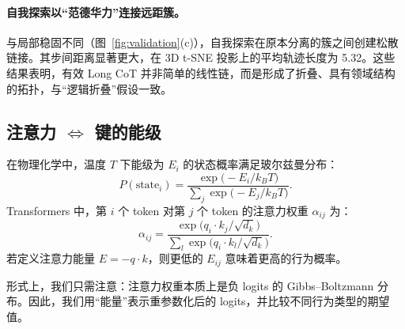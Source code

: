 \paragraph{\textbf{自我探索以“范德华力”连接远距簇。}}
与局部稳固不同（图~\ref{fig:validation}(c)），自我探索在原本分离的簇之间创建松散链接。其步间距离显著更大，在 3D t-SNE 投影上的平均轨迹长度为 5.32。这些结果表明，有效 Long CoT 并非简单的线性链，而是形成了折叠、具有领域结构的拓扑，与“逻辑折叠”假设一致。




\subsection{注意力 $\Leftrightarrow$ 键的能级}
在物理化学中，温度 \(T\) 下能级为 $E_i$ 的状态概率满足玻尔兹曼分布：
\begin{equation}
    P(\text{state}_i) = \frac{\exp\!\big(-E_i / k_B T\big)}{\sum_j {\exp\!\big(-E_j / k_B T\big)}}.
    \label{eq:energy}
\end{equation}
Transformers 中，第 $i$ 个 token 对第 $j$ 个 token 的注意力权重 \(\alpha_{ij}\) 为：
\begin{equation}
\alpha_{ij} = \frac{\exp\!\big(q_i \cdot k_j / \sqrt{d_k}\big)}{\sum_l \exp\!\big(q_i \cdot k_l / \sqrt{d_k}\big)}.
\end{equation}
若定义注意力能量 $E = - q \cdot k$，则更低的 $E_{ij}$ 意味着更高的行为概率。

形式上，我们只需注意：注意力权重本质上是负 logits 的 Gibbs–Boltzmann 分布。因此，我们用“能量”表示重参数化后的 logits，并比较不同行为类型的期望值。


